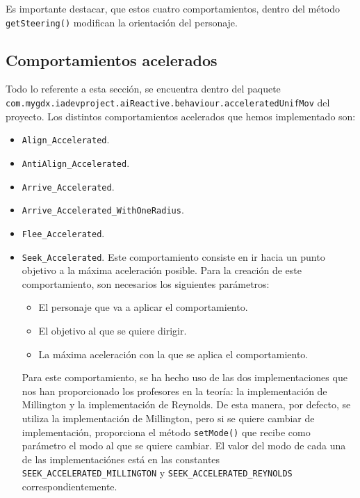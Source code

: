 Es importante destacar, que estos cuatro comportamientos, dentro del método \texttt{getSteering()} modifican la orientación del personaje.


\medskip
\subsection{Comportamientos acelerados}
Todo lo referente a esta sección, se encuentra dentro del paquete \\ \texttt{com.mygdx.iadevproject.aiReactive.behaviour.acceleratedUnifMov} del proyecto. Los distintos comportamientos acelerados que hemos implementado son:
\begin{itemize}
 \item \texttt{Align\_Accelerated}.
 \item \texttt{AntiAlign\_Accelerated}.
 \item \texttt{Arrive\_Accelerated}.
 \item \texttt{Arrive\_Accelerated\_WithOneRadius}.
 \item \texttt{Flee\_Accelerated}.
 
 
 \item \texttt{Seek\_Accelerated}. Este comportamiento consiste en ir hacia un punto objetivo a la máxima aceleración posible. Para la creación de este comportamiento, son necesarios los siguientes parámetros:
 \begin{itemize}
  \item El personaje que va a aplicar el comportamiento.
  \item El objetivo al que se quiere dirigir.
  \item La máxima aceleración con la que se aplica el comportamiento.
 \end{itemize}
 Para este comportamiento, se ha hecho uso de las dos implementaciones que nos han proporcionado los profesores en la teoría: la implementación de Millington y la implementación de Reynolds. De esta manera, por defecto, se utiliza la implementación de Millington, pero si se quiere cambiar de implementación, proporciona el método \texttt{setMode()} que recibe como parámetro el modo al que se quiere cambiar. El valor del modo de cada una de las implementaciónes está en las constantes \texttt{SEEK\_ACCELERATED\_MILLINGTON} y \texttt{SEEK\_ACCELERATED\_REYNOLDS} correspondientemente.
 

\end{itemize}
